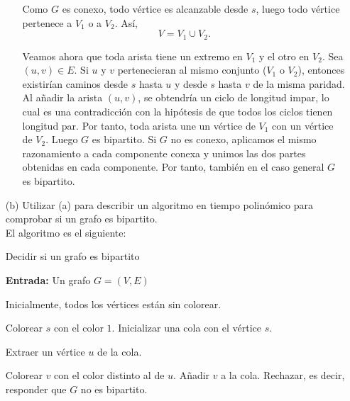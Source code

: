 \begin{ejercicio}
\begin{enumerate}
\begin{itemize}
            Como $G$ es conexo, todo vértice es alcanzable desde $s$, luego todo vértice pertenece a $V_1$ o a $V_2$. Así,
            $$
            V=V_1\cup V_2.
            $$

            Veamos ahora que toda arista tiene un extremo en $V_1$ y el otro en $V_2$. Sea $(u,v)\in E$. Si $u$ y $v$ pertenecieran al mismo 
            conjunto ($V_1$ o $V_2$), entonces existirían caminos desde $s$ hasta $u$ y desde $s$ hasta $v$ de la misma paridad. 
            Al añadir la arista $(u,v)$, se obtendría un ciclo de longitud impar, lo cual es una contradicción
            con la hipótesis de que todos los ciclos tienen longitud par. Por tanto, toda arista une un vértice de $V_1$ con un vértice de $V_2$.
            Luego $G$ es bipartito. Si $G$ no es conexo, aplicamos el mismo razonamiento a cada componente conexa y unimos las dos partes obtenidas en cada componente. Por tanto, también en el caso general $G$ es bipartito.

        \end{itemize}

        \item[(b)] Utilizar (a) para describir un algoritmo en tiempo polinómico para comprobar si un grafo es bipartito. \\
        
            El algoritmo es el siguiente:

            \begin{algorithm}
                \caption{Decidir si un grafo es bipartito}
                \label{algorithm:bipartito}
                \begin{algorithmic}
                    \State \textbf{Entrada:} Un grafo $G=(V,E)$

                    \State Inicialmente, todos los vértices están sin colorear.

                        \State Colorear $s$ con el color $1$.
                        \State Inicializar una cola con el vértice $s$.

                            \State Extraer un vértice $u$ de la cola.

                                    \State Colorear $v$ con el color distinto al de $u$.
                                    \State Añadir $v$ a la cola.
                                    \State Rechazar, es decir, responder que $G$ no es bipartito.
                                \EndIf
                            \EndFor
                        \EndWhile
                    \EndFor


\end{algorithmic}
\end{algorithm}
\end{enumerate}
\end{ejercicio}
